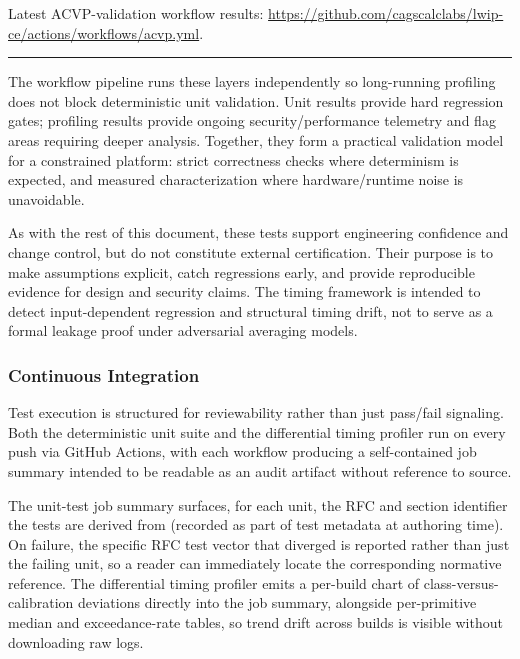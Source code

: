 \documentclass[titlepage]{report}
\begin{document}
	Latest ACVP-validation workflow results: \url{https://github.com/cagscalclabs/lwip-ce/actions/workflows/acvp.yml}.
	
\begin{center}
\rule{0.7\linewidth}{0.2pt}
\end{center}

	The workflow pipeline runs these layers independently so long-running profiling does not block deterministic unit validation. Unit results provide hard regression gates; profiling results provide ongoing security/performance telemetry and flag areas requiring deeper analysis. Together, they form a practical validation model for a constrained platform: strict correctness checks where determinism is expected, and measured characterization where hardware/runtime noise is unavoidable.
	
	As with the rest of this document, these tests support engineering confidence and change control, but do not constitute external certification. Their purpose is to make assumptions explicit, catch regressions early, and provide reproducible evidence for design and security claims. The timing framework is intended to detect input-dependent regression and structural timing drift, not to serve as a formal leakage proof under adversarial averaging models.

	\subsubsection{Continuous Integration}
	\label{ssec:ci}

	Test execution is structured for reviewability rather than just pass/fail signaling. Both the deterministic unit suite and the differential timing profiler run on every push via GitHub Actions, with each workflow producing a self-contained job summary intended to be readable as an audit artifact without reference to source.

	The unit-test job summary surfaces, for each unit, the RFC and section identifier the tests are derived from (recorded as part of test metadata at authoring time). On failure, the specific RFC test vector that diverged is reported rather than just the failing unit, so a reader can immediately locate the corresponding normative reference. The differential timing profiler emits a per-build chart of class-versus-calibration deviations directly into the job summary, alongside per-primitive median and exceedance-rate tables, so trend drift across builds is visible without downloading raw logs.
\end{document}
